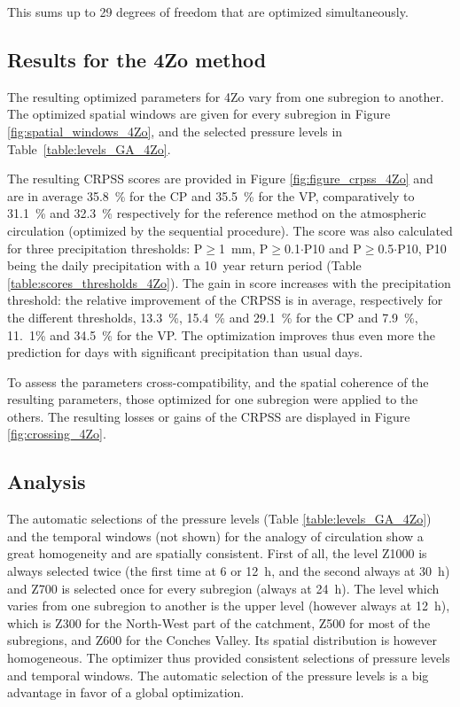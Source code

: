 \documentclass[review]{elsarticle}
\begin{document}
This sums up to 29 degrees of freedom that are optimized simultaneously.


\subsection{Results for the 4Zo method}

The resulting optimized parameters for 4Zo vary from one subregion to another. The optimized spatial windows are given for every subregion in Figure \ref{fig:spatial_windows_4Zo}, and the selected pressure levels in Table~\ref{table:levels_GA_4Zo}. 

The resulting CRPSS scores are provided in Figure \ref{fig:figure_crpss_4Zo} and are in average 35.8~\% for the CP and 35.5~\% for the VP, comparatively to 31.1~\% and 32.3~\% respectively for the reference method on the atmospheric circulation (optimized by the sequential procedure). The score was also calculated for three precipitation thresholds: P\(\geq\)1~mm, P\(\geq\)0.1\(\cdot\)P10 and P\(\geq\)0.5\(\cdot\)P10, P10 being the daily precipitation with a 10~year return period (Table \ref{table:scores_thresholds_4Zo}). The gain in score increases with the precipitation threshold: the relative improvement of the CRPSS is in average, respectively for the different thresholds, 13.3~\%, 15.4~\% and 29.1~\% for the CP and 7.9~\%, 11.~1\% and 34.5~\% for the VP. The optimization improves thus even more the prediction for days with significant precipitation than usual days.

To assess the parameters cross-compatibility, and the spatial coherence of the resulting parameters, those optimized for one subregion were applied to the others. The resulting losses or gains of the CRPSS are displayed in Figure \ref{fig:crossing_4Zo}.


\subsection{Analysis}

The automatic selections of the pressure levels (Table \ref{table:levels_GA_4Zo}) and the temporal windows (not shown) for the analogy of circulation show a great homogeneity and are spatially consistent. First of all, the level Z1000 is always selected twice (the first time at 6 or 12~h, and the second always at 30~h) and Z700 is selected once for every subregion (always at 24~h). The level which varies from one subregion to another is the upper level (however always at 12~h), which is Z300 for the North-West part of the catchment, Z500 for most of the subregions, and Z600 for the Conches Valley. Its spatial distribution is however homogeneous. The optimizer thus provided consistent selections of pressure levels and temporal windows. The automatic selection of the pressure levels is a big advantage in favor of a global optimization.
\end{document}
